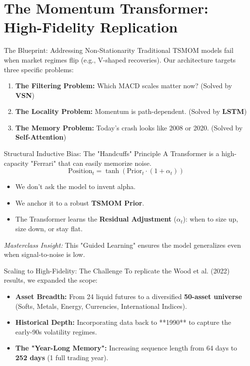 \section{The Momentum Transformer: High-Fidelity Replication}

\begin{frame}{The Blueprint: Addressing Non-Stationarity}
    Traditional TSMOM models fail when market regimes flip (e.g., V-shaped recoveries). Our architecture targets three specific problems:
    \begin{enumerate}
        \item \textbf{The Filtering Problem:} Which MACD scales matter now? (Solved by \textbf{VSN})
        \item \textbf{The Locality Problem:} Momentum is path-dependent. (Solved by \textbf{LSTM})
        \item \textbf{The Memory Problem:} Today's crash looks like 2008 or 2020. (Solved by \textbf{Self-Attention})
    \end{enumerate}
\end{frame}

\begin{frame}{Structural Inductive Bias: The "Handcuffs" Principle}
    A Transformer is a high-capacity "Ferrari" that can easily memorize noise.
    \begin{equation}
        \text{Position}_t = \tanh(\text{Prior}_t \cdot (1 + \alpha_t))
    \end{equation}
    \begin{itemize}
        \item We don't ask the model to invent alpha.
        \item We anchor it to a robust \textbf{TSMOM Prior}.
        \item The Transformer learns the \textbf{Residual Adjustment} ($\alpha_t$): when to size up, size down, or stay flat.
    \end{itemize}
    \textit{Masterclass Insight:} This "Guided Learning" ensures the model generalizes even when signal-to-noise is low.
\end{frame}

\begin{frame}{Scaling to High-Fidelity: The Challenge}
    To replicate the Wood et al. (2022) results, we expanded the scope:
    \begin{itemize}
        \item \textbf{Asset Breadth:} From 24 liquid futures to a diversified \textbf{50-asset universe} (Softs, Metals, Energy, Currencies, International Indices).
        \item \textbf{Historical Depth:} Incorporating data back to **1990** to capture the early-90s volatility regimes.
        \item \textbf{The "Year-Long Memory":} Increasing sequence length from 64 days to \textbf{252 days} (1 full trading year).
    \end{itemize}
\end{frame}

